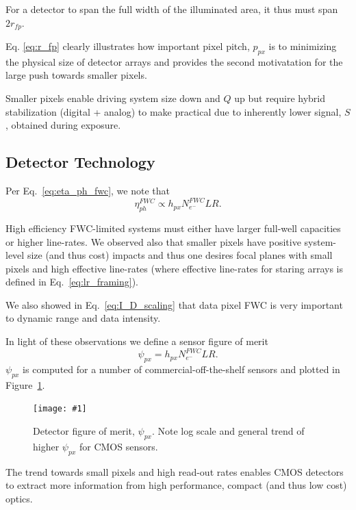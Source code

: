 \documentclass[]{spieman}  %
\newcommand{\includefigure}[3]
{
  \begin{figure}[h!tb]
  \centering
  \texttt{[image: \#1]}
  \caption[]{#3}
  \label{#2}
  \end{figure}
}
\begin{document}
For a detector to span the full width of the illuminated area, it thus must span $2 r_{fp}$. 

Eq. \eqref{eq:r_fp} clearly illustrates how important pixel pitch, $p_{px}$ is to minimizing the physical size of detector arrays and provides the second motivatation for the large push towards smaller pixels.

\begin{observation}
\label{obs:small_pix}
Smaller pixels enable driving system size down and $Q$ up but require hybrid stabilization (digital + analog) to make practical due to inherently lower signal, $S$, obtained during exposure.
\end{observation}

\subsection{Detector Technology}
\label{sec:detector_tech}

Per Eq.~\eqref{eq:eta_ph_fwc}, we note that 
\begin{equation}
    \eta_{ph}^{FWC} \propto h_{px}N_{e^-}^{FWC}LR.
\end{equation}

High efficiency FWC-limited systems must either have larger full-well capacities or higher line-rates.  We observed also that smaller pixels have positive system-level size (and thus cost) impacts and thus one desires focal planes with small pixels and high effective line-rates (where effective line-rates for staring arrays is defined in Eq.~\eqref{eq:lr_framing}).

We also showed in Eq.~\eqref{eq:I_D_scaling} that data pixel FWC is very important to dynamic range and data intensity.

In light of these observations we define a sensor figure of merit
\begin{equation}
    \psi_{px} = h_{px}N_{e^-}^{FWC}LR%
    \label{eq:psi_px}.
\end{equation}
$\psi_{px}$ is computed for a number of commercial-off-the-shelf sensors and plotted in Figure~\ref{fig:psi_px}.

\includefigure{figures/p_kpi.pgf}{fig:psi_px}{Detector figure of merit, $\psi_{px}$.  Note log scale and general trend of higher $\psi_{px}$ for CMOS sensors.}

\begin{observation}
The trend towards small pixels and high read-out rates enables CMOS detectors to extract more information from high performance, compact (and thus low cost) optics.
\end{observation}
\end{document}

